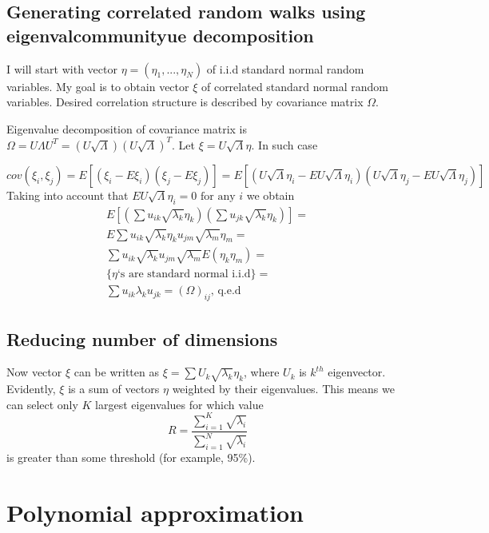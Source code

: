 \documentclass[11pt]{article} %
\newcommand{\euley}{U\sqrt{\Lambda}\eta}
\newcommand{\uley}[1]{\euley_#1}
\begin{document}
\subsection{Generating correlated random walks using eigenvalcommunityue decomposition}
I will start with vector $\eta = (\eta_1, ..., \eta_N)$ of i.i.d standard normal random variables. My goal is to obtain vector $\xi$ of correlated standard normal random variables. Desired correlation structure is described by covariance matrix $\Omega$.

Eigenvalue decomposition of covariance matrix is $\Omega = U \Lambda U^T = \left(U\sqrt{\Lambda}\right) \left(U\sqrt{\Lambda}\right)^T$. Let $\xi =\euley$. In such case

\begin{equation}
cov(\xi_i,\xi_j) = 
E\left[(\xi_i-E\xi_i)(\xi_j-E\xi_j)\right] =
E\left[\left(\uley{i}-E\uley{i}\right)\left(\uley{j}-E\uley{j}\right)\right]  \nonumber 
\end{equation}
Taking into account that $E\uley{i} = 0 \text{ for any } i$ we obtain
\begin{multline}
E\left[\left(\sum{u_{ik}\sqrt{\lambda_k}\eta_k}\right)\left(\sum{u_{jk}\sqrt{\lambda_k}\eta_k}\right)\right] = \\
E\sum{u_{ik}\sqrt{\lambda_k}\eta_k u_{jm}\sqrt{\lambda_m}\eta_m} = \\
\sum{u_{ik}\sqrt{\lambda_k}u_{jm}\sqrt{\lambda_m}E(\eta_k\eta_m)} = \\
 \{\eta\text{`s are standard normal i.i.d}\} = \\
\sum{u_{ik}\lambda_ku_{jk}} = \left(\Omega\right)_{ij} \text{, q.e.d}
\end{multline}

\subsection{Reducing number of dimensions}
Now vector $\xi$ can be written as  $\xi = \sum{U_k\sqrt{\lambda_k}\eta_k}$, where $U_k$ is $k^{th}$ eigenvector. Evidently, $\xi$ is a sum of vectors $\eta$ weighted by their eigenvalues. This means we can select only $K$ largest eigenvalues for which value
\begin{equation}
R = \frac{\sum_{i=1}^K{\sqrt{\lambda_i}}}{\sum_{i=1}^N{\sqrt{\lambda_i}}}
\end{equation} 
is greater than some threshold (for example, 95\%).

\section{Polynomial approximation}
\label{ap:Polynom}
\end{document}
